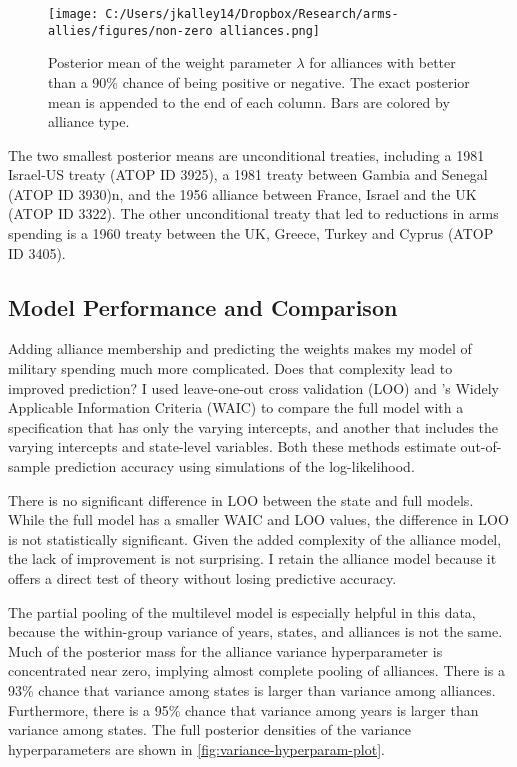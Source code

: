 \documentclass[12pt]{article}
\begin{document}
\begin{figure}[htbp]
	\centering
		\texttt{[image: C:/Users/jkalley14/Dropbox/Research/arms-allies/figures/non-zero alliances.png]}
	\caption{Posterior mean of the weight parameter $\lambda$ for alliances with better than a 90\% chance of being positive or negative. The exact posterior mean is appended to the end of each column. Bars are colored by alliance type.}
	\label{fig:non-zero alliances}
\end{figure}

The two smallest posterior means are unconditional treaties, including a 1981 Israel-US treaty (ATOP ID 3925), a 1981 treaty between Gambia and Senegal (ATOP ID 3930)n,  and the 1956 alliance between France, Israel and the UK (ATOP ID 3322). The other unconditional treaty that led to reductions in arms spending is a 1960 treaty between the UK, Greece, Turkey and Cyprus (ATOP ID 3405). 


\subsection*{Model Performance and Comparison}

Adding alliance membership and predicting the weights makes my model of military spending much more complicated. Does that complexity lead to improved prediction? I used leave-one-out cross validation (LOO) \citep{Vehtarietal2017} and \citet{Watanabe2010}'s Widely Applicable Information Criteria (WAIC) to compare the full model with a specification that has only the varying intercepts, and another that includes the varying intercepts and state-level variables. Both these methods estimate out-of-sample prediction accuracy using simulations of the log-likelihood. 

There is no significant difference in LOO between the state and full models. While the full model has a smaller WAIC and LOO values, the difference in LOO is not statistically significant. Given the added complexity of the alliance model, the lack of improvement is not surprising. I retain the alliance model because it offers a direct test of theory without losing predictive accuracy. 

The partial pooling of the multilevel model is especially helpful in this data, because the within-group variance of years, states, and alliances is not the same. Much of the posterior mass for the alliance variance hyperparameter is concentrated near zero, implying almost complete pooling of alliances. There is a 93\% chance that variance among states is larger than variance among alliances. Furthermore, there is a 95\% chance that variance among years is larger than variance among states. The full posterior densities of the variance hyperparameters are shown in \autoref{fig:variance-hyperparam-plot}. 
\end{document}
